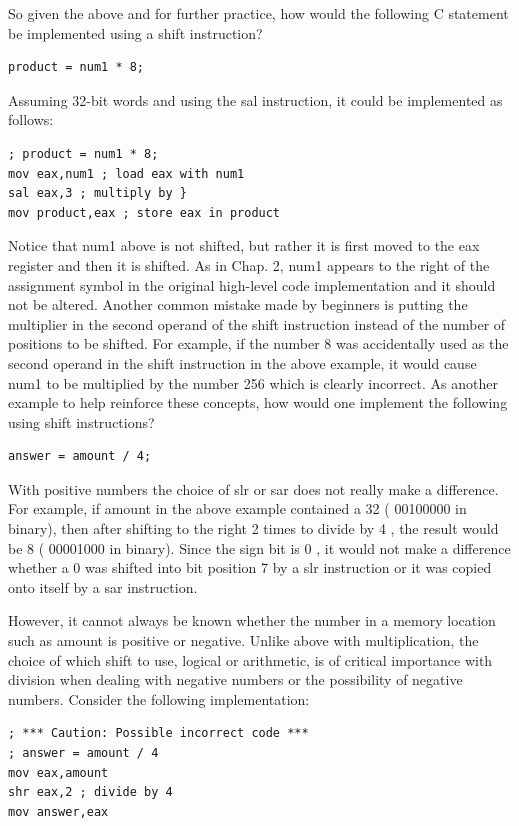 \documentclass[10pt]{book}
\begin{document}
So given the above and for further practice, how would the following C statement be implemented using a shift instruction?

\begin{verbatim}
product = num1 * 8;
\end{verbatim}

Assuming 32-bit words and using the sal instruction, it could be implemented as follows:

\begin{verbatim}
; product = num1 * 8;
mov eax,num1 ; load eax with num1
sal eax,3 ; multiply by }
mov product,eax ; store eax in product
\end{verbatim}

Notice that num1 above is not shifted, but rather it is first moved to the eax register and then it is shifted. As in Chap. 2, num1 appears to the right of the assignment symbol in the original high-level code implementation and it should not be altered. Another common mistake made by beginners is putting the multiplier in the second operand of the shift instruction instead of the number of positions to be shifted. For example, if the number 8 was accidentally used as the second operand in the shift instruction in the above example, it would cause num1 to be multiplied by the number 256 which is clearly incorrect. As another example to help reinforce these concepts, how would one implement the following using shift instructions?

\begin{verbatim}
answer = amount / 4;
\end{verbatim}

With positive numbers the choice of slr or sar does not really make a difference. For example, if amount in the above example contained a 32 ( 00100000 in binary), then after shifting to the right 2 times to divide by 4 , the result would be 8 ( 00001000 in binary). Since the sign bit is 0 , it would not make a difference whether a 0 was shifted into bit position 7 by a slr instruction or it was copied onto itself by a sar instruction.

However, it cannot always be known whether the number in a memory location such as amount is positive or negative. Unlike above with multiplication, the choice of which shift to use, logical or arithmetic, is of critical importance with division when dealing with negative numbers or the possibility of negative numbers. Consider the following implementation:

\begin{verbatim}
; *** Caution: Possible incorrect code ***
; answer = amount / 4
mov eax,amount
shr eax,2 ; divide by 4
mov answer,eax
\end{verbatim}
\end{document}
